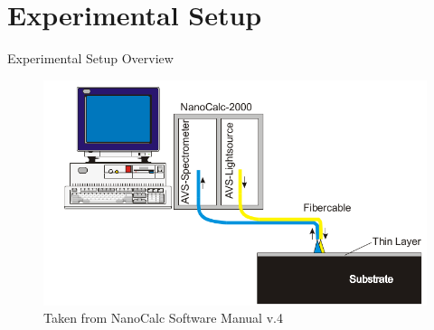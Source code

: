 \documentclass[10pt]{beamer}
\begin{document}
	
	\section{Experimental Setup}
	
\begin{frame}{Experimental Setup Overview}
	\begin{figure}
	\centering
	\includegraphics[width=\textwidth]{nanocalcsetup.png}
	\caption{Taken from NanoCalc Software Manual v.4}
	\end{figure}
\end{frame}	
		
%		
%	
\end{document}
